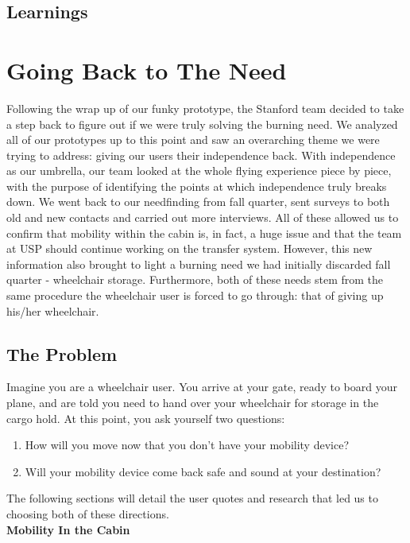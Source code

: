 \subsection{Learnings}
\section{Going Back to The Need}
Following the wrap up of our funky prototype, the Stanford team decided to take a step back to figure out if we were truly solving the burning need. We analyzed all of our prototypes up to this point and saw an overarching theme we were trying to address: giving our users their independence back. With independence as our umbrella, our team looked at the whole flying experience piece by piece, with the purpose of identifying the points at which independence truly breaks down. We went back to our needfinding from fall quarter, sent surveys to both old and new contacts and carried out more interviews. All of these allowed us to confirm that mobility within the cabin is, in fact, a huge issue and that the team at USP should continue working on the transfer system. However, this new information also brought to light a burning need we had initially discarded fall quarter - wheelchair storage. Furthermore, both of these needs stem from the same procedure the wheelchair user is forced to go through: that of giving up his/her wheelchair. 

\subsection{The Problem}

Imagine you are a wheelchair user. You arrive at your gate, ready to board your plane, and are told you need to hand over your wheelchair for storage in the cargo hold. At this point, you ask yourself two questions: 
\begin{enumerate}
	\item How will you move now that you don't have your mobility device? 
	\item Will your mobility device come back safe and sound at your destination?
\end{enumerate}
The following sections will detail the user quotes and research that led us to choosing both of these directions.  
\\

\textbf{Mobility In the Cabin}

